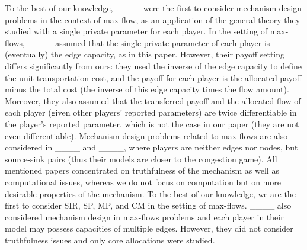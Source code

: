 To the best of our knowledge, ____ were the first to consider mechanism design problems in the context of max-flow, as an application of the general theory they studied with a single private parameter for each player. In the setting of max-flows,  ____ assumed that the single private parameter of each player is (eventually) the edge capacity, as in this paper. However, their payoff setting differs significantly from ours: they used the inverse of the edge capacity to define the unit transportation cost, and the payoff for each player is the allocated payoff minus the total cost (the inverse of this edge capacity times the flow amount). Moreover, they also assumed that the transferred payoff  and the allocated flow of each player (given other players' reported parameters) are twice differentiable in the player's reported parameter, which is not the case in our paper (they are not even differentiable). 
Mechanism design problems related to max-flows are also considered in ____ and ____, where players are neither edges nor nodes, but source-sink pairs (thus their models are closer to the congestion game). 
All mentioned papers concentrated on truthfulness of the mechanism as well as computational issues, whereas we do not focus on computation but on more desirable properties of the mechanism. To the best of our knowledge, we are the first to consider SIR, SP, MP, and CM in the setting of max-flows.
____ also considered mechanism design in max-flows problems and each player in their model may possess capacities of multiple edges. However, they did not consider truthfulness issues and only core allocations were studied.